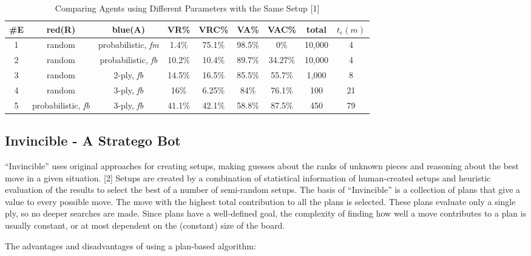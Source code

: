 \documentclass{article}
\begin{document}
\begin{table}
  \caption{Comparing Agents using Different Parameters with the Same Setup [1]}
  \label{multi-agent-results}
  \centering
  \begin{tabular}{ccccccccc}
  \#E     &red(R) & blue(A) & VR\% & VRC\% & VA\% & VAC\% & total & $t_e(m)$  \\
  \toprule
    1			& random	& probabilistic, \textit{fm}	& 1.4\%	              & 75.1\%  & 98.5\% & 0\%      & 10,000  & 4\\
    2	    & random	& probabilistic, \textit{fb}	& 10.2\%	            & 10.4\%  & 89.7\% & 34.27\%  & 10,000  & 4\\
    3     & random	& 2-ply, \textit{fb}	        & 14.5\%	            & 16.5\%  & 85.5\% & 55.7\%   & 1,000   & 8\\
    4			& random	& 3-ply, \textit{fb}	        & 16\%	              & 6.25\%  & 84\%   & 76.1\%   & 100     & 21\\
    5			& probabilistic, \textit{fb}	& 3-ply, \textit{fb}	& 41.1\%	&42.1\%   & 58.8\% & 87.5\%   & 450     & 79\\
    \bottomrule
  \end{tabular}
\end{table}

\subsection{Invincible - A Stratego Bot}

“Invincible” uses original approaches for creating setups, making guesses about the ranks of unknown pieces and reasoning about the best move in a given situation. [2] 
Setups are created by a combination of statistical information of human-created setups and heuristic evaluation of the results to select the best of a number of semi-random setups. 
The basis of “Invincible” is a collection of plans that give a value to every possible move. The move with the highest total contribution to all the plans is selected. 
These plans evaluate only a single ply, so no deeper searches are made. 
Since plans have a well-defined goal, the complexity of finding how well a move contributes to a plan is usually constant, or at most dependent on the (constant) size of the board. 

The advantages and disadvantages of using a plan-based algorithm:
\end{document}
